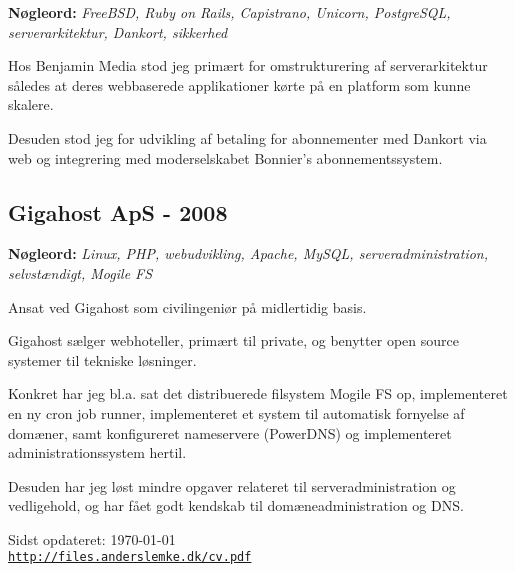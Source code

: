 \documentclass[a4paper]{article}
\newcommand{\keywords}[1]{\small\textbf{Nøgleord:} \emph{#1}\normalsize}
\begin{document}
\keywords{FreeBSD, Ruby on Rails, Capistrano, Unicorn, PostgreSQL, serverarkitektur, Dankort, sikkerhed}

Hos Benjamin Media stod jeg primært for omstrukturering af serverarkitektur således at deres webbaserede applikationer kørte på en platform som kunne skalere.

Desuden stod jeg for udvikling af betaling for abonnementer med Dankort via web og integrering med moderselskabet Bonnier's abonnementssystem.

\subsection*{Gigahost ApS - 2008}

\keywords{Linux, PHP, webudvikling, Apache, MySQL, serveradministration, selvstændigt, Mogile FS}

Ansat ved Gigahost som civilingeniør på midlertidig basis.

Gigahost sælger webhoteller, primært til private, og benytter open source systemer til tekniske løsninger.

Konkret har jeg bl.a. sat det distribuerede filsystem Mogile FS op, implementeret en ny cron job runner, implementeret et system til automatisk fornyelse af domæner, samt konfigureret nameservere (PowerDNS) og implementeret administrationssystem hertil.

Desuden har jeg løst mindre opgaver relateret til serveradministration og vedligehold, og har fået godt kendskab til domæneadministration og DNS.



\bigskip

\begin{center}
\begin{footnotesize}
Sidst opdateret: \today \\
\href{http://files.anderslemke.dk/cv.pdf}{\tt http://files.anderslemke.dk/cv.pdf}
\end{footnotesize}
\end{center}
\end{document}

